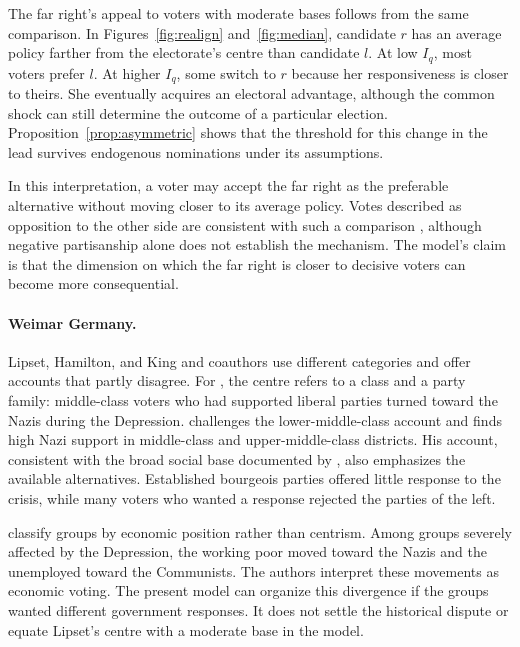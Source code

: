 \documentclass[12pt,letterpaper]{article}
\begin{document}
The far right's appeal to voters with moderate bases follows from the same comparison. In Figures~\ref{fig:realign} and~\ref{fig:median}, candidate $r$ has an average policy farther from the electorate's centre than candidate $l$. At low $I_q$, most voters prefer $l$. At higher $I_q$, some switch to $r$ because her responsiveness is closer to theirs. She eventually acquires an electoral advantage, although the common shock can still determine the outcome of a particular election. Proposition~\ref{prop:asymmetric} shows that the threshold for this change in the lead survives endogenous nominations under its assumptions.

In this interpretation, a voter may accept the far right as the preferable alternative without moving closer to its average policy. Votes described as opposition to the other side are consistent with such a comparison \citep{AbramowitzWebster2016}, although negative partisanship alone does not establish the mechanism. The model's claim is that the dimension on which the far right is closer to decisive voters can become more consequential.

\paragraph{Weimar Germany.}
Lipset, Hamilton, and King and coauthors use different categories and offer accounts that partly disagree. For \citet{Lipset1960}, the centre refers to a class and a party family: middle-class voters who had supported liberal parties turned toward the Nazis during the Depression. \citet{Hamilton1982} challenges the lower-middle-class account and finds high Nazi support in middle-class and upper-middle-class districts. His account, consistent with the broad social base documented by \citet{Childers1983}, also emphasizes the available alternatives. Established bourgeois parties offered little response to the crisis, while many voters who wanted a response rejected the parties of the left.

\citet{King2008} classify groups by economic position rather than centrism. Among groups severely affected by the Depression, the working poor moved toward the Nazis and the unemployed toward the Communists. The authors interpret these movements as economic voting. The present model can organize this divergence if the groups wanted different government responses. It does not settle the historical dispute or equate Lipset's centre with a moderate base in the model.
\end{document}
